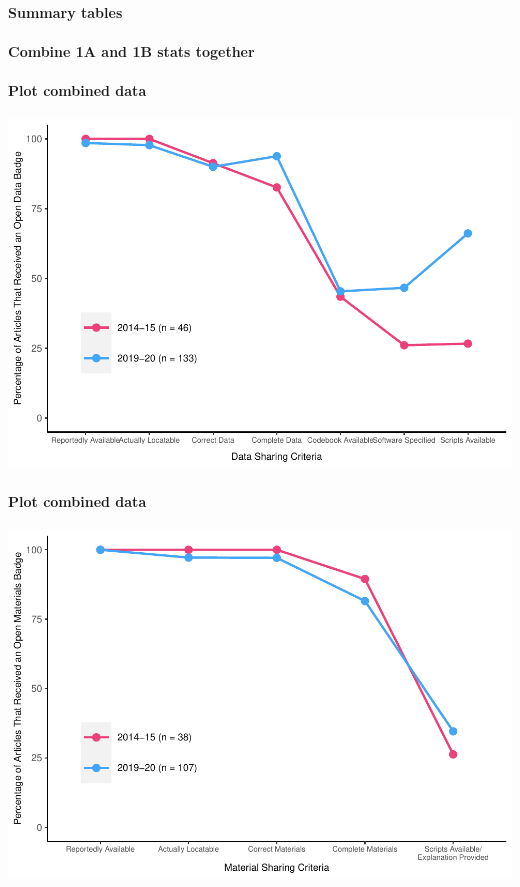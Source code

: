 \documentclass[
  english,
  man]{apa6}
\let\oldparagraph\paragraph
\renewcommand{\paragraph}[1]{\oldparagraph{#1}\mbox{}}
\begin{document}
\hypertarget{summary-tables}{%
\paragraph{Summary tables}\label{summary-tables}}

\hypertarget{combine-1a-and-1b-stats-together}{%
\paragraph{Combine 1A and 1B stats together}\label{combine-1a-and-1b-stats-together}}

\hypertarget{plot-combined-data}{%
\paragraph{Plot combined data}\label{plot-combined-data}}

\includegraphics{icd_special_issue_files/figure-latex/combo-plot-1.pdf}

\hypertarget{plot-combined-data-1}{%
\paragraph{Plot combined data}\label{plot-combined-data-1}}

\includegraphics{icd_special_issue_files/figure-latex/combo-m-plot-1.pdf}
\end{document}
